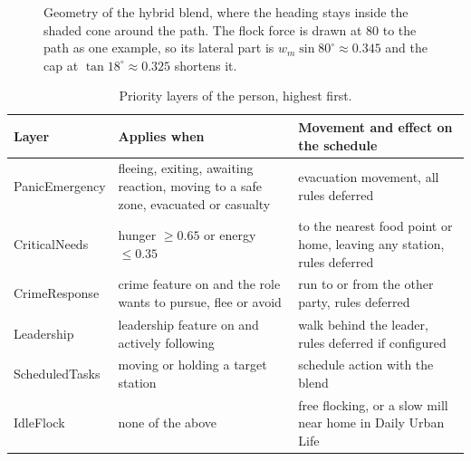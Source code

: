\begin{figure}[H]
\centering
{}
\caption[Geometry of the hybrid blend]{Geometry of the hybrid blend, where the heading stays inside the shaded cone around the path. The flock force is drawn at 80\textdegree{} to the path as one example, so its lateral part is $w_m\sin 80^\circ\approx0.345$ and the cap at $\tan 18^\circ\approx0.325$ shortens it.}
\label{fig:blend-geometry}
\end{figure}

\begin{table}[H]
\centering
{\compacttable
\begin{tabularx}{\textwidth}{|l|Q|Q|}
\hline
{}\textbf{Layer} & \textbf{Applies when} & \textbf{Movement and effect on the schedule} \\
\hline
PanicEmergency & fleeing, exiting, awaiting reaction, moving to a safe zone, evacuated or casualty & evacuation movement, all rules deferred \\ \hline
CriticalNeeds & hunger $\ge0.65$ or energy $\le0.35$ & to the nearest food point or home, leaving any station, rules deferred \\ \hline
CrimeResponse & crime feature on and the role wants to pursue, flee or avoid & run to or from the other party, rules deferred \\ \hline
Leadership & leadership feature on and actively following & walk behind the leader, rules deferred if configured \\ \hline
ScheduledTasks & moving or holding a target station & schedule action with the blend \\ \hline
IdleFlock & none of the above & free flocking, or a slow mill near home in Daily Urban Life \\ \hline
\end{tabularx}}
\caption[Priority layers of the person]{Priority layers of the person, highest first.}
\label{tab:priority-layers}
\end{table}

